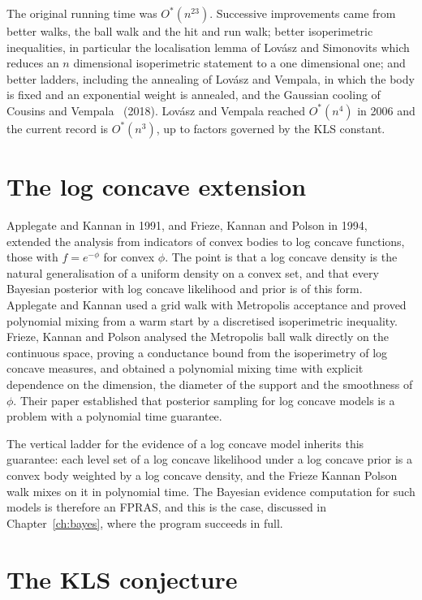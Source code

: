 The original running time was $O^*(n^{23})$. Successive improvements came from better walks, the ball walk and the hit and run walk; better isoperimetric inequalities, in particular the localisation lemma of Lov\'asz and Simonovits which reduces an $n$ dimensional isoperimetric statement to a one dimensional one; and better ladders, including the annealing of Lov\'asz and Vempala, in which the body is fixed and an exponential weight is annealed, and the Gaussian cooling of Cousins and Vempala~\cite{CousinsVempala} (2018). Lov\'asz and Vempala reached $O^*(n^4)$ in 2006 and the current record is $O^*(n^3)$, up to factors governed by the KLS constant.

\section{The log concave extension}

Applegate and Kannan in 1991, and Frieze, Kannan and Polson in 1994, extended the analysis from indicators of convex bodies to log concave functions, those with $f = e^{-\phi}$ for convex $\phi$. The point is that a log concave density is the natural generalisation of a uniform density on a convex set, and that every Bayesian posterior with log concave likelihood and prior is of this form. Applegate and Kannan used a grid walk with Metropolis acceptance and proved polynomial mixing from a warm start by a discretised isoperimetric inequality. Frieze, Kannan and Polson analysed the Metropolis ball walk directly on the continuous space, proving a conductance bound from the isoperimetry of log concave measures, and obtained a polynomial mixing time with explicit dependence on the dimension, the diameter of the support and the smoothness of $\phi$. Their paper established that posterior sampling for log concave models is a problem with a polynomial time guarantee.

The vertical ladder for the evidence of a log concave model inherits this guarantee: each level set of a log concave likelihood under a log concave prior is a convex body weighted by a log concave density, and the Frieze Kannan Polson walk mixes on it in polynomial time. The Bayesian evidence computation for such models is therefore an FPRAS, and this is the case, discussed in Chapter~\ref{ch:bayes}, where the program succeeds in full.

\section{The KLS conjecture}

